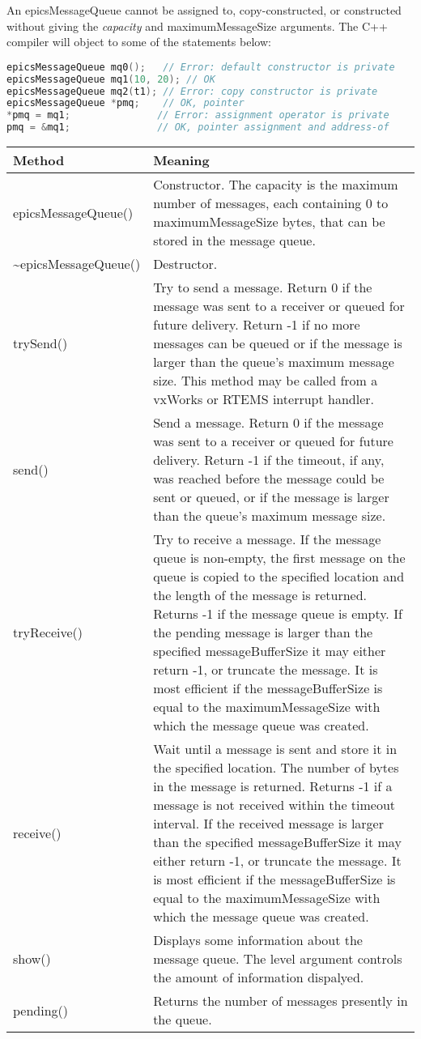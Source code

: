 An epicsMessageQueue cannot be assigned to, copy-constructed, or constructed without giving the \emph{capacity} and 
maximumMessageSize arguments.
The C++ compiler will object to some of the statements below:

\begin{lstlisting}[language=C++]
epicsMessageQueue mq0();   // Error: default constructor is private
epicsMessageQueue mq1(10, 20); // OK
epicsMessageQueue mq2(t1); // Error: copy constructor is private
epicsMessageQueue *pmq;    // OK, pointer
*pmq = mq1;               // Error: assignment operator is private
pmq = &mq1;               // OK, pointer assignment and address-of
\end{lstlisting}

\begin{center}
\begin{longtable}{p{1.35in}p{5.0in}}
\textbf{Method} & \textbf{Meaning}\\
\hline
epicsMessageQueue() & Constructor.
The capacity is the maximum number of messages, each containing 0 to maximumMessageSize bytes, that can be stored in the message queue.\\
\~{}epicsMessageQueue() & Destructor.\\
trySend() & Try to send a message.
Return 0 if the message was sent to a receiver or queued for future delivery.
Return -1 if no more messages can be queued or if the message is larger than the queue's maximum message size.
This method may be called from a vxWorks or RTEMS interrupt handler.\\
send() & Send a message.
Return 0 if the message was sent to a receiver or queued for future delivery.
Return -1 if the timeout, if any, was reached before the message could be sent or queued, or if the message is larger than the queue's maximum message size.\\
tryReceive() & Try to receive a message.
If the message queue is non-empty, the first message on the queue is copied to the specified location and the length of the message is returned.
Returns -1 if the message queue is empty.
If the pending message is larger than the specified messageBufferSize it may either return -1, or truncate the message.
It is most efficient if the messageBufferSize is equal to the maximumMessageSize with which the message queue was created.\\
receive() & Wait until a message is sent and store it in the specified location.
The number of bytes in the message is returned.
Returns -1 if a message is not received within the timeout interval.
If the received message is larger than the specified messageBufferSize it may either return -1, or truncate the message.
It is most efficient if the messageBufferSize is equal to the maximumMessageSize with which the message queue was created.\\
show() & Displays some information about the message queue.
The level argument controls the amount of information dispalyed.\\
pending() & Returns the number of messages presently in the queue.
\end{longtable}

\end{center}


